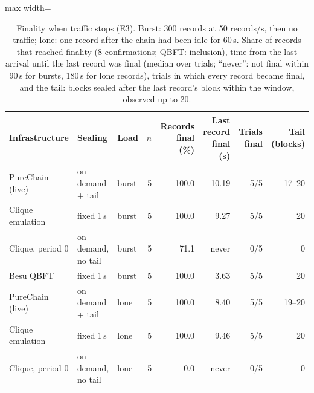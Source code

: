 \begin{table}[t]
\centering
\scriptsize
\caption{Finality when traffic stops (E3). Burst: 300 records at 50 records/s, then no traffic; lone: one record after the chain had been idle for 60\,s. Share of records that reached finality (8 confirmations; QBFT: inclusion), time from the last arrival until the last record was final (median over trials; ``never'': not final within 90\,s for bursts, 180\,s for lone records), trials in which every record became final, and the tail: blocks sealed after the last record's block within the window, observed up to 20.}
\label{tab:e12}
\begin{adjustbox}{max width=\textwidth}
\begin{tabular}{lllrrrrr}
\toprule
Infrastructure & Sealing & Load & $n$ & Records final (\%) & Last record final (s) & Trials final & Tail (blocks) \\
\midrule
PureChain (live) & on demand + tail & burst & 5 & 100.0 & 10.19 & 5/5 & 17--20 \\
Clique emulation & fixed 1\,s & burst & 5 & 100.0 & 9.27 & 5/5 & 20 \\
Clique, period 0 & on demand, no tail & burst & 5 & 71.1 & never & 0/5 & 0 \\
Besu QBFT & fixed 1\,s & burst & 5 & 100.0 & 3.63 & 5/5 & 20 \\
PureChain (live) & on demand + tail & lone & 5 & 100.0 & 8.40 & 5/5 & 19--20 \\
Clique emulation & fixed 1\,s & lone & 5 & 100.0 & 9.46 & 5/5 & 20 \\
Clique, period 0 & on demand, no tail & lone & 5 & 0.0 & never & 0/5 & 0 \\
\bottomrule
\end{tabular}\end{adjustbox}
\end{table}
